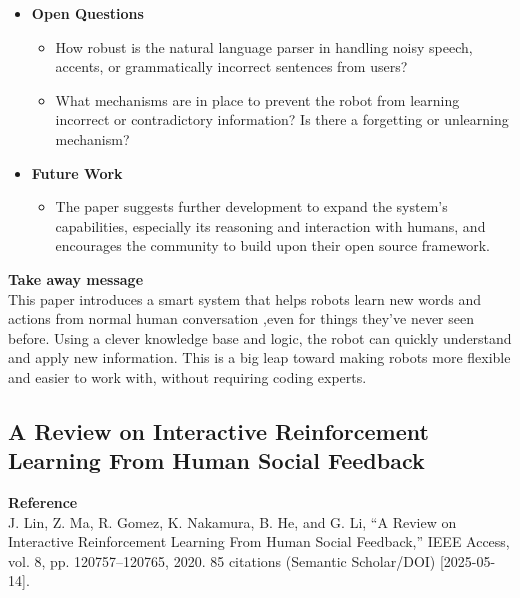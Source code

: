 \documentclass[report.tex]{subfiles}
\begin{document}
\begin{itemize}
    \item \noindent\textbf {Open Questions}
    \begin{itemize}
        \item How robust is the natural language parser in handling noisy speech, accents, or
grammatically incorrect sentences from users?
        \item What mechanisms are in place to prevent the robot from learning incorrect or contradictory
information? Is there a forgetting or unlearning mechanism?
    \end{itemize}
    
    \item \noindent\textbf{Future Work}
    \begin{itemize}
        \item The paper suggests further development to expand the system's capabilities, especially its
reasoning and interaction with humans, and encourages the community to build upon their
open source framework.
    \end{itemize}
\end{itemize}


\noindent\textbf{Take away message}  \\
This paper introduces a smart system that helps robots learn new words and actions from
normal human conversation ,even for things they've never seen before. Using a clever
knowledge base and logic, the robot can quickly understand and apply new information.
This is a big leap toward making robots more flexible and easier to work with, without
requiring coding experts.













\subsection{A Review on Interactive Reinforcement
Learning From Human Social Feedback} 

\noindent\textbf{Reference} \\
\cite{lin_review_2020}J. Lin, Z. Ma, R. Gomez, K. Nakamura, B. He, and G. Li, “A Review on Interactive Reinforcement
Learning From Human Social Feedback,” IEEE Access, vol. 8, pp. 120757–120765, 2020. 85 citations (Semantic Scholar/DOI) [2025-05-14]. \\
\end{document}
